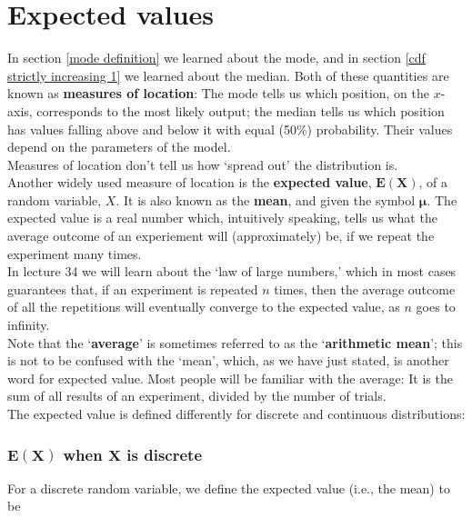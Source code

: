\section{Expected values} \label{measures of location} \label{expected value} \label{E(X)}
In section \ref{mode definition} we learned about the mode, and in section \ref{cdf strictly increasing 1} we learned about the median. Both of these quantities are known as \textbf{measures of location}: The mode tells us which position, on the $x$-axis, corresponds to the most likely output; the median tells us which position has values falling above and below it with equal (50\%) probability. Their values depend on the parameters of the model. \\

\noindent Measures of location don't tell us how `spread out' the distribution is. \\

\noindent Another widely used measure of location is the \textbf{expected value}, $\boldsymbol{E(X)}$, of a random variable, $X$. It is also known as the \textbf{mean}, and given the symbol $\boldsymbol{\mu}$. The expected value is a real number which, intuitively speaking, tells us what the average outcome of an experiement will (approximately) be, if we repeat the experiment many times. \\

\noindent In lecture 34 we will learn about the `law of large numbers,' which in most cases guarantees that, if an experiment is repeated $n$ times, then the average outcome of all the repetitions will eventually converge to the expected value, as $n$ goes to infinity. \\

\noindent Note that the `\textbf{average}' is sometimes referred to as the `\textbf{arithmetic mean}'; this is not to be confused with the `mean', which, as we have just stated, is another word for expected value. Most people will be familiar with the average: It is the sum of all results of an experiment, divided by the number of trials. \\

\noindent The expected value is defined differently for discrete and continuous distributions:

\subsubsection{$\boldsymbol{E(X)}$ when $\boldsymbol{X}$ is discrete}
For a discrete random variable, we define the expected value (i.e., the mean) to be

